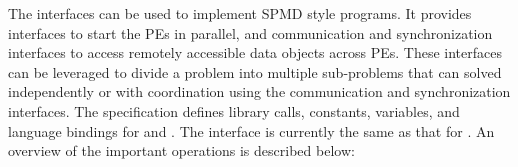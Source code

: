 

The \openshmem{} interfaces can be used to implement \ac{SPMD} style programs. It provides interfaces 
to start the \openshmem{} \ac{PE}s in parallel, and communication and synchronization interfaces to access remotely accessible data objects across \ac{PE}s. These interfaces can be leveraged to divide a problem into multiple sub-problems that can solved independently or with coordination using the communication and synchronization interfaces.
The \openshmem specification defines library calls, constants, variables, and language bindings for \Clang{} and \Fortran{}.
The \Cpp{} interface is currently the same as that for \Clang. An overview of the important \openshmem operations is described below:

